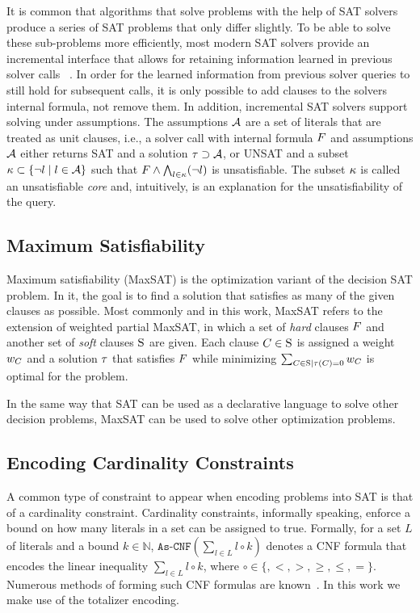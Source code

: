 It is common that algorithms that solve problems with the help of SAT solvers produce a series of SAT problems that only differ slightly.
To be able to solve these sub-problems more efficiently, most modern SAT solvers provide an incremental interface that allows for retaining information learned in previous solver calls~\autocite{DBLP:journals/entcs/EenS03,handbook2-cdcl} .
In order for the learned information from previous solver queries to still hold for subsequent calls, it is only possible to add clauses to the solvers internal formula, not remove them.
In addition, incremental SAT solvers support solving under assumptions.
The assumptions $\mathcal{A}$ are a set of literals that are treated as unit clauses, i.e., a solver call with internal formula $F$ and assumptions $\mathcal{A}$ either returns SAT and a solution $\tau \supset \mathcal{A}$, or UNSAT and a subset $\kappa \subset \{\lnot l \mid l\in\mathcal{A}\}$ such that $F \land \bigwedge_{l \in \kappa} (\lnot l)$ is unsatisfiable.
The subset $\kappa$ is called an unsatisfiable \emph{core} and, intuitively, is an explanation for the unsatisfiability of the query.

\subsection{Maximum Satisfiability\label{sec:max-sat}}

Maximum satisfiability (MaxSAT) is the optimization variant of the decision SAT problem.
In it, the goal is to find a solution that satisfies as many of the given clauses as possible.
Most commonly and in this work, MaxSAT refers to the extension of weighted partial MaxSAT, in which a set of \emph{hard} clauses $F$ and another set of \emph{soft} clauses $\textsc{S}$ are given.
Each clause $C \in \textsc{S}$ is assigned a weight $w_C$ and a solution $\tau$ that satisfies $F$ while minimizing $\sum_{C\in\textsc{S} \mid \tau(C)=0} w_C$ is optimal for the problem.

In the same way that SAT can be used as a declarative language to solve other decision problems, MaxSAT can be used to solve other optimization problems.

\subsection{Encoding Cardinality Constraints\label{sec:card-const}}

A common type of constraint to appear when encoding problems into SAT is that of a cardinality constraint.
Cardinality constraints, informally speaking, enforce a bound on how many literals in a set can be assigned to true.
Formally, for a set $L$ of literals and a bound $k \in \mathbb{N}$, $\texttt{As-CNF}\left(\sum_{l \in L} l \circ k\right)$ denotes a CNF formula that encodes the linear inequality $\sum_{l \in L} l \circ k$, where $\circ \in \{ ,< ,> ,\geq, \leq, =\}$.
Numerous methods of forming such CNF formulas are known~\autocite{DBLP:conf/cp/BailleuxB03}.
In this work we make use of the totalizer encoding.

